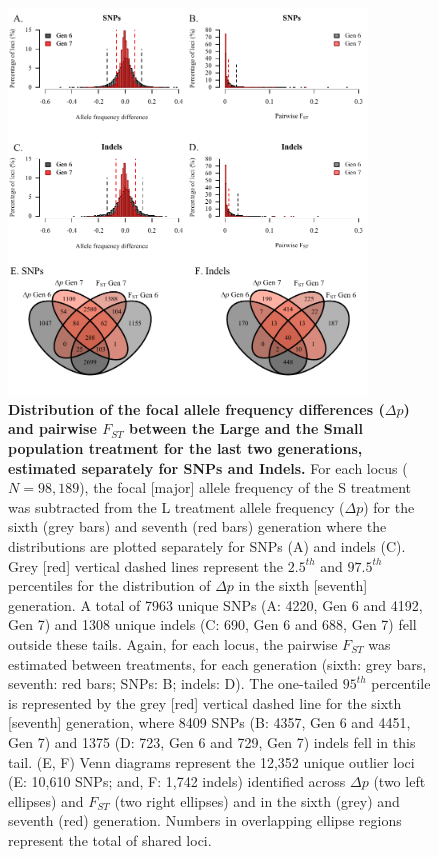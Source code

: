 \FloatBarrier

\begin{figure}[!h]
    \centering
    \includegraphics[width=0.85\textwidth]{Chp4_DNA/2023_FstNdeltapDists.pdf}
\caption[Distribution of the focal allele frequency differences ($\Delta p$) and pairwise $F_{ST}$ between the Large and the Small population treatment for the last two generations, estimated separately for SNPs and Indels.]{\textbf{Distribution of the focal allele frequency differences ($\Delta p$) and pairwise $F_{ST}$ between the Large and the Small population treatment for the last two generations, estimated separately for SNPs and Indels.} For each locus ($N= 98,189$), the focal [major] allele frequency of the S treatment was subtracted from the L treatment allele frequency ($\Delta p$) for the sixth (grey bars) and seventh (red bars) generation where the distributions are plotted separately for SNPs (A) and indels (C). Grey [red] vertical dashed lines represent the $2.5^{th}$ and $97.5^{th}$ percentiles for the distribution of $\Delta p$ in the sixth [seventh] generation. A total of 7963 unique SNPs (A: 4220, Gen 6 and 4192, Gen 7) and 1308 unique indels (C: 690, Gen 6 and 688, Gen 7) fell outside these tails. Again, for each locus, the pairwise $F_{ST}$ was estimated between treatments, for each generation (sixth: grey bars, seventh: red bars; SNPs: B; indels: D). The one-tailed $95^{th}$ percentile is represented by the grey [red] vertical dashed line for the sixth [seventh] generation, where 8409 SNPs (B: 4357, Gen 6 and 4451, Gen 7) and 1375 (D: 723, Gen 6 and 729, Gen 7) indels fell in this tail. (E, F) Venn diagrams represent the 12,352 unique outlier loci (E: 10,610 SNPs; and, F: 1,742 indels) identified across $\Delta p$ (two left ellipses) and $F_{ST}$ (two right ellipses) and in the sixth (grey) and seventh (red) generation. Numbers in overlapping ellipse regions represent the total of shared loci.}
    \label{fig:FitFstNdeltapDists}
\end{figure}

